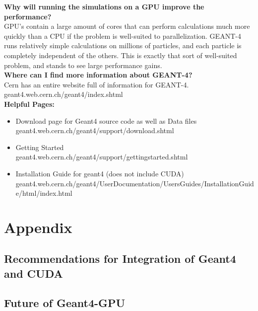 \documentclass[12pt]{article}
\begin{document}
\textbf{Why will running the simulations on a GPU improve the performance?}\\
GPU's contain a large amount of cores that can perform calculations much more quickly than a CPU if the problem is well-suited to parallelization. GEANT-4 runs relatively simple calculations on millions of particles, and each particle is completely independent of the others. This is exactly that sort of well-suited problem, and stands to see large performance gains.\\

\textbf{Where can I find more information about GEANT-4?}\\
Cern has an entire website full of information for GEANT-4.\\ geant4.web.cern.ch/geant4/index.shtml\\

\textbf{Helpful Pages:}
\begin{itemize}
\item Download page for Geant4 source code as well as Data files\\ geant4.web.cern.ch/geant4/support/download.shtml
\item Getting Started\\ geant4.web.cern.ch/geant4/support/gettingstarted.shtml
\item Installation Guide for geant4 (does not include CUDA)\\ geant4.web.cern.ch/geant4/UserDocumentation/UsersGuides/InstallationGuide/html/index.html
\end{itemize}

\section{Appendix} %
\subsection{Recommendations for Integration of Geant4 and CUDA}
\subsection{Future of Geant4-GPU}
\end{document}

